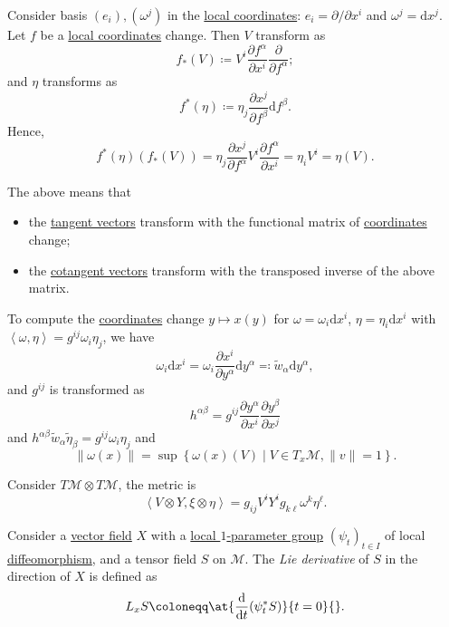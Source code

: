 Consider basis \((e_i), (\omega ^j)\) in the \hyperref[def:coordinate-chart]{local coordinates}: \(e_i = \partial / \partial x^i\) and \(\omega ^j = \mathrm{d} x^j\). Let \(f\) be a \hyperref[def:coordinate-chart]{local coordinates} change. Then \(V\) transform as
\[
	f_{\ast }(V) \coloneqq V^i \frac{\partial f^\alpha }{\partial x^i} \frac{\partial }{\partial f^\alpha } ;
\]
and \(\eta \) transforms as
\[
	f^{\ast} (\eta ) \coloneqq \eta _j \frac{\partial x^j}{\partial f^\beta } \mathrm{d} f^\beta .
\]
Hence,
\[
	f^{\ast} (\eta )(f_{\ast } (V))
	= \eta _j \frac{\partial x^j}{\partial f^\alpha } V^i \frac{\partial f^\alpha }{\partial x^i}
	= \eta _i V^i = \eta (V).
\]

\begin{intuition}
	The above means that
	\begin{itemize}
		\item the \hyperref[def:tangent-vector]{tangent vectors} transform with the functional matrix of \hyperref[def:coordinate-chart]{coordinates} change;
		\item the \hyperref[def:cotangent-vector]{cotangent vectors} transform with the transposed inverse of the above matrix.
	\end{itemize}
\end{intuition}

To compute the \hyperref[def:coordinate-chart]{coordinates} change \(y \mapsto x(y)\) for \(\omega = \omega _i \mathrm{d} x^i\), \(\eta = \eta _i \mathrm{d} x^i\) with \(\left\langle \omega , \eta \right\rangle = g^{ij} \omega _i \eta _j\), we have
\[
	\omega _i \mathrm{d} x^i
	= \omega _i \frac{\partial x^i}{\partial y^\alpha } \mathrm{d} y^\alpha
	\eqqcolon \widetilde{w} _\alpha \mathrm{d} y^\alpha,
\]
and \(g^{ij} \) is transformed as
\[
	h^{\alpha \beta } = g^{ij} \frac{\partial y^\alpha }{\partial x^i} \frac{\partial y^\beta }{\partial x^j}
\]
and \(h^{\alpha \beta } \widetilde{w} _\alpha \widetilde{\eta} _\beta = g^{ij} \omega _i \eta _j \) and
\[
	\lVert \omega (x) \rVert = \sup \left\{ \omega (x) (V) \mid V\in T_x \mathcal{M} , \lVert v \rVert = 1\right\}.
\]

Consider \(T \mathcal{M} \otimes T\mathcal{M} \), the metric is
\[
	\left\langle V \otimes Y, \xi \otimes \eta \right\rangle = g_{ij} V^i Y^i g_{k \ell }\omega ^k \eta ^\ell .
\]

\begin{definition}\label{def:Lie-derivative}
	Consider a \hyperref[def:vector-field]{vector field} \(X\) with a \hyperref[def:local-1-parameter-group]{local \(1\)-parameter group} \((\psi _t)_{t\in I}\) of local \hyperref[def:diffeomorphism]{diffeomorphism}, and a tensor field \(S\) on \(\mathcal{M} \). The \emph{Lie derivative} of \(S\) in the direction of \(X\) is defined as
	\[
		L_x S \coloneqq \at{\frac{\mathrm{d}}{\mathrm{d}t} (\psi _t^{\ast} S)}{t=0}{} .
	\]
\end{definition}

